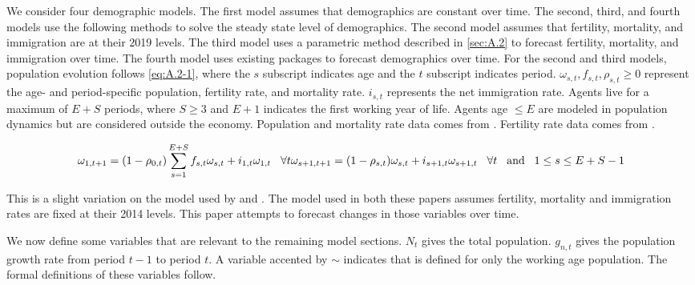 \documentclass[10pt]{article}
\renewcommand{\thesection}{\arabic{section}}
\renewcommand{\thesubsection}{\thesection.\arabic{subsection}}
\renewcommand{\thesubsubsection}{\thesubsection.\arabic{subsubsection}}
\numberwithin{equation}{subsection}
\renewcommand{\subsubsection}[2][]{\oldsubsubsection[#1]{#2}\index{#1}\label{sec:\thesubsubsection}}
\begin{document}
\begin{appendices}
\subsubsection{Demographics}

We consider four demographic models. The first model assumes that demographics are constant over time. The second, third, and fourth models use the following methods to solve the steady state level of demographics. The second model assumes that fertility, mortality, and immigration are at their 2019 levels. The third model uses a parametric method described in \autoref{sec:A.2} to forecast fertility, mortality, and immigration over time. The fourth model uses existing packages to forecast demographics over time. For the second and third models, population evolution follows \ref{eq:A.2-1}, where the \(s\) subscript indicates age and the \(t\) subscript indicates period. \(\omega_{s,t}, f_{s,t}, \rho_{s,t} \geq 0\) represent the age- and period-specific population, fertility rate, and mortality rate. \(i_{s,t}\) represents the net immigration rate. Agents live for a maximum of \(E+S\) periods, where \(S \geq 3\) and \(E + 1\) indicates the first working year of life. Agents age \(\leq E\) are modeled in population dynamics but are considered outside the economy. Population and mortality rate data comes from \cite{JMD2018}. Fertility rate data comes from \cite{HFC2018}.

\begin{dmath}
   {\omega_{1,t+1} = (1 - \rho_{0,t})\sum_{s=1}^{E+S}f_{s,t}\omega_{s,t} + i_{1,t}\omega_{1,t} \hspace{3mm} \forall t} \\
   {\omega_{s+1,t+1} = (1 - \rho_{s,t})\omega_{s,t} + i_{s+1,t}\omega_{s+1,t} \hspace{3mm} \forall t \hspace{3mm} \text{and} \hspace{3mm} 1 \leq s \leq E + S - 1}
\end{dmath}

\par This is a slight variation on the model used by \cite{DE2018} and \citet{IO2019}. The model used in both these papers assumes fertility, mortality and immigration rates are fixed at their 2014 levels. This paper attempts to forecast changes in those variables over time.

\par We now define some variables that are relevant to the remaining model sections. \(N_t\) gives the total population. \(g_{n,t}\) gives the population growth rate from period \(t-1\) to period \(t\). A variable accented by \(\sim\) indicates that is defined for only the working age population. The formal definitions of these variables follow.


\end{appendices}
\end{document}

